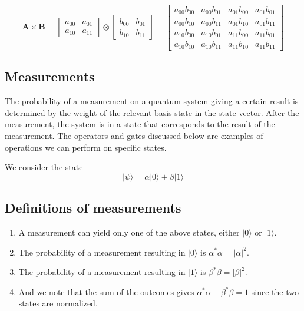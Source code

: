 \[
\bm{A} \times \bm{B} = \begin{bmatrix} a_{00} & a_{01} \\ a_{10} & a_{11} \end{bmatrix} \otimes \begin{bmatrix} b_{00} & b_{01} \\ b_{10} & b_{11} \end{bmatrix} =
\begin{bmatrix} a_{00} b_{00} &  a_{00}b_{01} & a_{01} b_{00} & a_{01}b_{01} \\
                a_{00} b_{10} &  a_{00}b_{11} & a_{01} b_{10} & a_{01}b_{11} \\
                a_{10} b_{00} &  a_{10}b_{01} & a_{11} b_{00} & a_{11}b_{01} \\
                a_{10} b_{10} &  a_{10}b_{11} & a_{11} b_{10} & a_{11}b_{11} \end{bmatrix}
\]

\subsection{Measurements}

The probability of a measurement on a quantum system giving a certain
result is determined by the weight of the relevant basis state in the
state vector. After the measurement, the system is in a state that
corresponds to the result of the measurement. The operators and
gates discussed below are examples of operations we can perform on
specific states.

We  consider the state
\[
\vert \psi\rangle = \alpha \vert 0 \rangle +\beta \vert 1 \rangle
\]

\subsection{Definitions of measurements}

\begin{enumerate}
\item A measurement can yield only one of the above states, either $\vert 0\rangle$ or $\vert 1\rangle$.

\item The probability of a measurement resulting in $\vert 0\rangle$ is $\alpha^*\alpha = \vert \alpha \vert^2$.

\item The probability of a measurement resulting in $\vert 1\rangle$ is $\beta^*\beta = \vert \beta \vert^2$.

\item And we note that the sum of the outcomes gives $\alpha^*\alpha+\beta^*\beta=1$ since the two states are normalized.
\end{enumerate}

